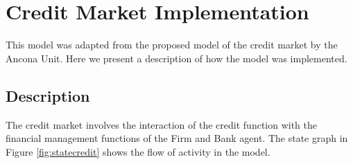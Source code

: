 \section{Credit Market Implementation}

This model was adapted from the proposed model of the credit market
by the Ancona Unit. Here we present a description of how
the model was implemented.

\subsection{Description}
The credit market involves the interaction of the credit function
with the financial management functions of the Firm and Bank agent.
The state graph in Figure \ref{fig:statecredit} shows the flow of
activity in the model.

%
%
%
%
%




